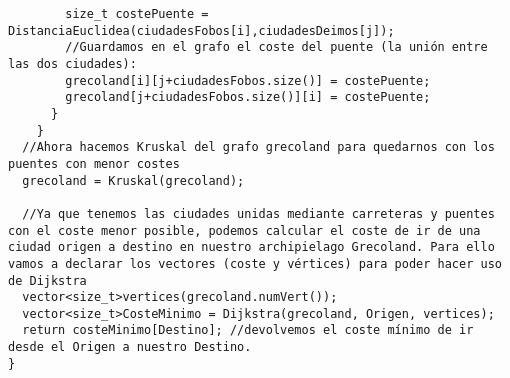 \begin{verbatim}
        size_t costePuente = DistanciaEuclidea(ciudadesFobos[i],ciudadesDeimos[j]);
        //Guardamos en el grafo el coste del puente (la unión entre las dos ciudades):
        grecoland[i][j+ciudadesFobos.size()] = costePuente;
        grecoland[j+ciudadesFobos.size()][i] = costePuente;
      }
    }
  //Ahora hacemos Kruskal del grafo grecoland para quedarnos con los puentes con menor costes
  grecoland = Kruskal(grecoland);

  //Ya que tenemos las ciudades unidas mediante carreteras y puentes con el coste menor posible, podemos calcular el coste de ir de una ciudad origen a destino en nuestro archipielago Grecoland. Para ello vamos a declarar los vectores (coste y vértices) para poder hacer uso de Dijkstra
  vector<size_t>vertices(grecoland.numVert());
  vector<size_t>CosteMinimo = Dijkstra(grecoland, Origen, vertices);
  return costeMinimo[Destino]; //devolvemos el coste mínimo de ir desde el Origen a nuestro Destino.
}
\end{verbatim}